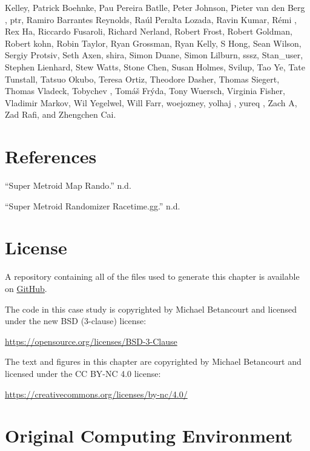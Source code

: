 \documentclass[
  letterpaper,
  DIV=11,
  numbers=noendperiod]{scrartcl}
\newlength{\cslhangindent}
\newenvironment{CSLReferences}[2] %
 {\begin{list}{}{%
  \setlength{\itemindent}{0pt}
  \setlength{\leftmargin}{0pt}
  \setlength{\parsep}{0pt}
  \ifodd #1
   \setlength{\leftmargin}{\cslhangindent}
   \setlength{\itemindent}{-1\cslhangindent}
  \fi
  \setlength{\itemsep}{#2\baselineskip}}}
 {\end{list}}
\begin{document}
Kelley, Patrick Boehnke, Pau Pereira Batlle, Peter Johnson, Pieter van
den Berg , ptr, Ramiro Barrantes Reynolds, Raúl Peralta Lozada, Ravin
Kumar, Rémi , Rex Ha, Riccardo Fusaroli, Richard Nerland, Robert Frost,
Robert Goldman, Robert kohn, Robin Taylor, Ryan Grossman, Ryan Kelly, S
Hong, Sean Wilson, Sergiy Protsiv, Seth Axen, shira, Simon Duane, Simon
Lilburn, sssz, Stan\_user, Stephen Lienhard, Stew Watts, Stone Chen,
Susan Holmes, Svilup, Tao Ye, Tate Tunstall, Tatsuo Okubo, Teresa Ortiz,
Theodore Dasher, Thomas Siegert, Thomas Vladeck, Tobychev , Tomáš Frýda,
Tony Wuersch, Virginia Fisher, Vladimir Markov, Wil Yegelwel, Will Farr,
woejozney, yolhaj , yureq , Zach A, Zad Rafi, and Zhengchen Cai.

\section*{References}\label{references}

\label{refs}
\begin{CSLReferences}{1}{0}
{``Super Metroid Map Rando.''} n.d.

{``Super Metroid Randomizer \textbar{} Racetime.gg.''} n.d.

\end{CSLReferences}

\section*{License}\label{license}

A repository containing all of the files used to generate this chapter
is available on
\href{https://github.com/betanalpha/quarto_chapters/tree/main/case_studies/racing}{GitHub}.

The code in this case study is copyrighted by Michael Betancourt and
licensed under the new BSD (3-clause) license:

\url{https://opensource.org/licenses/BSD-3-Clause}

The text and figures in this chapter are copyrighted by Michael
Betancourt and licensed under the CC BY-NC 4.0 license:

\url{https://creativecommons.org/licenses/by-nc/4.0/}

\section*{Original Computing
Environment}\label{original-computing-environment}
\end{document}
